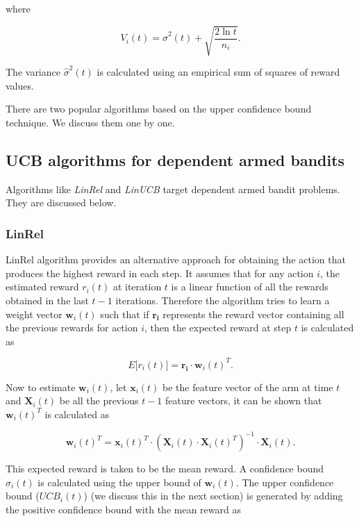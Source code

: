 \documentclass[english]{tktltiki}
\begin{document}
where

\begin{equation}
	V_i(t) = \hat{\sigma}^2(t) + \sqrt{\frac{2 \ln t}{n_i}}.
\end{equation}

The variance $\hat{\sigma}^2(t)$ is calculated using an empirical sum of squares of reward values.

There are two popular algorithms based on the upper confidence bound technique. We discuss them one by one.

\subsection{UCB algorithms for dependent armed bandits}

Algorithms like \textit{LinRel} and \textit{LinUCB} target dependent armed bandit problems. They are discussed below.


\subsubsection{LinRel}

LinRel algorithm \cite{linrel} provides an alternative approach for obtaining the action that produces the highest reward in each step. It assumes that for any action $i$, the estimated reward $r_i(t)$ at iteration $t$ is a linear function of all the rewards obtained in the last $t-1$ iterations. Therefore the algorithm tries to learn a weight vector $\mathbf{w}_i(t)$ such that if $\mathbf{r_i}$ represents the reward vector containing all the previous rewards for action $i$, then the expected reward at step $t$ is calculated as

\begin{equation}
E\big[r_i(t)\big] = \mathbf{r_i} \cdot \mathbf{w}_i(t)^T.
\end{equation}

Now to estimate $\mathbf{w}_i(t)$, let $\mathbf{x}_i(t)$ be the feature vector of the arm at time $t$ and $\mathbf{X}_i(t)$ be all the previous $t-1$ feature vectors, it can be shown that $\mathbf{w}_i(t)^T$ is calculated as

\begin{equation}
\mathbf{w}_i(t)^T = \mathbf{x}_i(t)^T \cdot (\mathbf{X}_i(t) \cdot \mathbf{X}_i(t)^T)^{-1} \cdot \mathbf{X}_i(t).
\end{equation}


This expected reward is taken to be the mean reward. A confidence bound $\sigma_i(t)$ is calculated using the upper bound of $\mathbf{w}_i(t)$. The upper confidence bound ($UCB_i(t)$) \cite{ucb} (we discuss this in the next section) is generated by adding the positive confidence bound with the mean reward as
\end{document}
